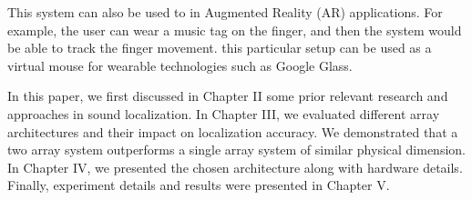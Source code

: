 This system can also be used to in Augmented Reality (AR) applications. For example, the user can wear a music tag on the finger, and then the system would be able to track the finger movement. this particular setup can be used as a virtual mouse for wearable technologies such as Google Glass. 


In this paper, we first discussed in Chapter II some prior relevant research and approaches in sound localization. In Chapter III, we evaluated different array architectures and their impact on localization accuracy. We demonstrated that a two array system outperforms a single array system of similar physical dimension. In Chapter IV, we presented the chosen architecture along with hardware details. Finally, experiment details and results were presented in Chapter V.
